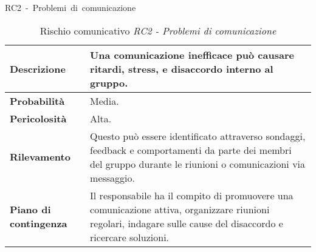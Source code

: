 \begin{table}[!h]
    \centering
    \hbox{RC2 - Problemi di comunicazione }
    \vspace{0.3cm}
	\begin{tabular}{|l|p{10cm}|} 
		\hline
		\textbf{Descrizione} & Una comunicazione inefficace può causare ritardi, stress, e disaccordo interno al gruppo.  \\ 
        \hline
        \textbf{Probabilità} & Media. \\
        \hline
        \textbf{Pericolosità} & Alta. \\
        \hline
        \textbf{Rilevamento} & Questo può essere identificato attraverso sondaggi, feedback e comportamenti da parte dei membri del gruppo durante le riunioni o comunicazioni via messaggio. \\
        \hline
        \textbf{Piano di contingenza} & Il responsabile ha il compito di promuovere una comunicazione attiva, organizzare riunioni regolari, indagare sulle cause del disaccordo e ricercare soluzioni. \\
		\hline
	\end{tabular}
    \caption{Rischio comunicativo \textit{RC2 - Problemi di comunicazione}}
    \label{table:9}
\end{table}
